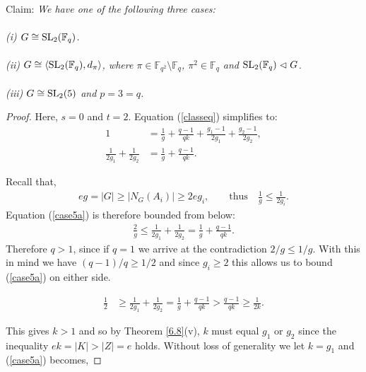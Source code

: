 \begin{theorem}[Case V]\\
\\
Claim: \textit{We have one of the following three cases: \\
\\
(i) $G \cong \operatorname{SL}_2(\mathbb{F}_q)$. \\
\\
(ii) $G \cong \langle \operatorname{SL}_2(\mathbb{F}_q), d_\pi \rangle$, where $\pi \in \mathbb{F}_{q^2} \setminus \mathbb{F}_q$, $\pi^2 \in \mathbb{F}_q$ and $\operatorname{SL}_2(\mathbb{F}_q) \vartriangleleft G$. \\
\\
(iii) $G \cong \operatorname{SL}_2(5)$ and $p=3=q$.}
\end{theorem}

\begin{proof} Here, $s = 0$ and $t = 2$. Equation (\ref{classeq}) simplifies to:
\begin{align} \label{case5a} 1 &= \frac{1}{g} + \frac{q-1}{qk} + \frac{g_1 -1}{2g_1} + \frac{g_2 -1}{2g_2}, \nonumber
\\ 
\frac{1}{2g_1} + \frac{1}{2g_2} &= \frac{1}{g} + \frac{q-1}{qk}. \end{align}

Recall that,
\begin{align*} eg = |G| \geq  |N_G(A_i)| \geq 2eg_i, \qquad \text{thus} \quad \! \frac{1}{g} \leq \frac{1}{2g_i}.
\end{align*}
Equation (\ref{case5a}) is therefore bounded from below:
\begin{align*}  \frac{2}{g} \leq \frac{1}{2g_1} + \frac{1}{2g_2} = \frac{1}{g} + \frac{q-1}{qk}. 
\end{align*}
Therefore $q>1$, since if $q=1$ we arrive at the contradiction $2/g \leq 1/g$. With this in mind we have $(q-1)/q \geq 1/2$ and since $g_i \geq 2$ this allows us to bound (\ref{case5a}) on either side.

\begin{align*} \frac{1}{2} &\geq \frac{1}{2g_1} + \frac{1}{2g_2} = \frac{1}{g} + \frac{q-1}{qk} > \frac{q-1}{qk} \geq \frac{1}{2k}.
\end{align*}

This gives $k > 1$ and so by Theorem \ref{6.8}(v), $k$ must equal $g_1$ or $g_2$ since the inequality $ek = |K| > |Z| = e$ holds. Without loss of generality we let $k=g_1$ and (\ref{case5a}) becomes,


\end{proof}
